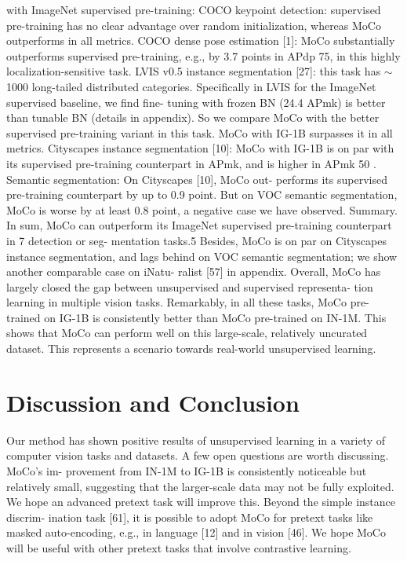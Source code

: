 \documentclass[10pt,twocolumn]{article}  %
\begin{document}
with ImageNet supervised pre-training:
COCO keypoint detection: supervised pre-training has
no clear advantage over random initialization, whereas
MoCo outperforms in all metrics.
COCO dense pose estimation [1]: MoCo substantially
outperforms supervised pre-training, e.g., by 3.7 points in
APdp
75, in this highly localization-sensitive task.
LVIS v0.5 instance segmentation [27]: this task has
$\sim $1000 long-tailed distributed categories. Speciﬁcally in
LVIS for the ImageNet supervised baseline, we ﬁnd ﬁne-
tuning with frozen BN (24.4 APmk) is better than tunable
BN (details in appendix). So we compare MoCo with the
better supervised pre-training variant in this task. MoCo
with IG-1B surpasses it in all metrics.
Cityscapes instance segmentation [10]: MoCo with IG-1B
is on par with its supervised pre-training counterpart in
APmk, and is higher in APmk
50 .
Semantic segmentation: On Cityscapes [10], MoCo out-
performs its supervised pre-training counterpart by up to 0.9
point. But on VOC semantic segmentation, MoCo is worse
by at least 0.8 point, a negative case we have observed.
Summary. In sum, MoCo can outperform its ImageNet
supervised pre-training counterpart in 7 detection or seg-
mentation tasks.5 Besides, MoCo is on par on Cityscapes
instance segmentation, and lags behind on VOC semantic
segmentation; we show another comparable case on iNatu-
ralist [57] in appendix. Overall, MoCo has largely closed
the gap between unsupervised and supervised representa-
tion learning in multiple vision tasks.
Remarkably, in all these tasks, MoCo pre-trained on
IG-1B is consistently better than MoCo pre-trained on
IN-1M. This shows that MoCo can perform well on this
large-scale, relatively uncurated dataset. This represents a
scenario towards real-world unsupervised learning.

\section{Discussion and Conclusion}
Our method has shown positive results of unsupervised
learning in a variety of computer vision tasks and datasets.
A few open questions are worth discussing. MoCo's im-
provement from IN-1M to IG-1B is consistently noticeable
but relatively small, suggesting that the larger-scale data
may not be fully exploited. We hope an advanced pretext
task will improve this. Beyond the simple instance discrim-
ination task [61], it is possible to adopt MoCo for pretext
tasks like masked auto-encoding, e.g., in language [12] and
in vision [46]. We hope MoCo will be useful with other
pretext tasks that involve contrastive learning.



\end{document}
